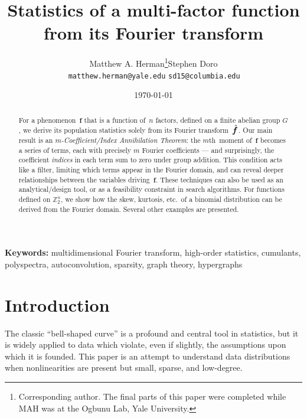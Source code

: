 \documentclass[letterpaper,11pt]{article}
\newcommand{\bs}[1]{{\boldsymbol{#1}}}
\newcommand{\Int}{\mathbb Z}
\newcommand{\hatbsf}{{\kern+0.25em}\hat{{\kern-0.25em}\bs{f}}}
\newcommand{\mth}{$m$th}
\theoremstyle{definition} \newtheorem{remark}{Remark}
\begin{document}

\title{Statistics of a multi-factor function\\ from its Fourier transform}

\author{Matthew A. Herman\thanks{Corresponding author. The final parts of this paper were completed while MAH was at the Ogbunu Lab, Yale University.}\qquad \qquad\quad Stephen Doro \\ \;\;\,\normalsize\texttt{matthew.herman@yale.edu} \qquad\; \texttt{sd15@columbia.edu} \;}

\date{\today}

\maketitle

\begin{abstract}
For a phenomenon~$\bs{f}$ that is a function of~$n$ factors, defined on a finite abelian group $G$, we derive its population statistics solely from its Fourier transform~$\hatbsf$. Our main result is an \emph{$m$-Coefficient/Index Annihilation Theorem}: the \mth\ moment of~$\bs{f}$ becomes a series of terms, each with precisely $m$ Fourier coefficients --- and surprisingly, the coefficient \emph{indices} in each term sum to zero under group addition. This condition acts like a filter, limiting which terms appear in the Fourier domain, and can reveal deeper relationships between the variables driving~$\bs{f}$. These techniques can also be used as an analytical/design tool, or as a feasibility constraint in search algorithms. For functions defined on $\Int_2^n$, we show how the skew, kurtosis, etc.~of a binomial distribution can be derived from the Fourier domain. Several other examples are presented.
\end{abstract}

\textbf{Keywords:} multidimensional Fourier transform, high-order statistics, cumulants, polyspectra, autoconvolution, sparsity, graph theory, hypergraphs

\section{Introduction}
The classic ``bell-shaped curve'' is a profound and central tool in statistics, but it is widely applied to data which violate, even if slightly, the assumptions upon which it is founded. This paper is an attempt to understand data distributions when nonlinearities are present but small, sparse, and low-degree.
\end{document}
